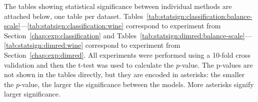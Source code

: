 \documentclass[12pt,a4paper]{report}
\let\openright=\clearpage
\begin{document}



\listoffigures

\listofalgorithmes

\listoftables


\printacronyms[include-classes=abbrev,heading=none] %



 \label{chap:attachments}

The tables showing statistical significance between individual methods are attached below, one table per dataset. Tables~\ref{tab:statsign:classification:balance-scale}---\ref{tab:statsign:classification:wine} correspond to experiment from Section~\ref{chap:exp:classification} and Tables~\ref{tab:statsign:dimred:balance-scale}---\ref{tab:statsign:dimred:wine} correspond to experiment from Section~\ref{chap:exp:dimred}. All experiments were performed using a 10-fold cross validation and then the t-test was used to calculate the $p$-value. The p-values are not shown in the tables directly, but they are encoded in asterisks: the smaller the $p$-value, the larger the significance between the models. More asterisks signify larger significance.




\openright
\end{document}
